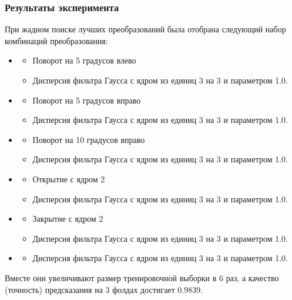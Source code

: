 \documentclass[10pt]{article}
\begin{document}
\begin{itemize}
		    \subsubsection*{Результаты эксперимента}
		    {
		    	При жадном поиске лучших преобразований была отобрана следующий набор комбинаций преобразования:
		    	\begin{itemize}
		    		\item
		    		\begin{itemize}
		    			\item
		    			Поворот на 5 градусов влево
		    			\item
		    			Дисперсия фильтра Гаусса с ядром из единиц 3 на 3 и параметром 1.0.
		    		\end{itemize}
		    		\item
		    		\begin{itemize}
		    			\item
		    			Поворот на 5 градусов вправо
		    			\item
		    			Дисперсия фильтра Гаусса с ядром из единиц 3 на 3 и параметром 1.0.
		    		\end{itemize}
	    		    \item
	    		    \begin{itemize}
	    		    	\item
	    		    	Поворот на 10 градусов вправо
	    		    	\item
	    		    	Дисперсия фильтра Гаусса с ядром из единиц 3 на 3 и параметром 1.0.
	    		    \end{itemize}
    		        \item
    		        \begin{itemize}
    		        	\item
    		        	Открытие с ядром 2
    		        	\item
    		        	Дисперсия фильтра Гаусса с ядром из единиц 3 на 3 и параметром 1.0.
    		        \end{itemize}
    	            \item
    	            \begin{itemize}
    	            	\item
    	            	Закрытие с ядром 2
    	            	\item
    	            	Дисперсия фильтра Гаусса с ядром из единиц 3 на 3 и параметром 1.0.
    	            \end{itemize}
                    \item
                    \begin{itemize}
                    	\item
                    	Дисперсия фильтра Гаусса с ядром из единиц 3 на 3 и параметром 1.0.
                    \end{itemize}
		    	\end{itemize}
	    	    Вместе они увеличивают размер тренировочной выборки в 6 раз, а качество (точность) предсказания на 3 фолдах достигает 0.9839.
		    }
		    

\end{itemize}
\end{document}

